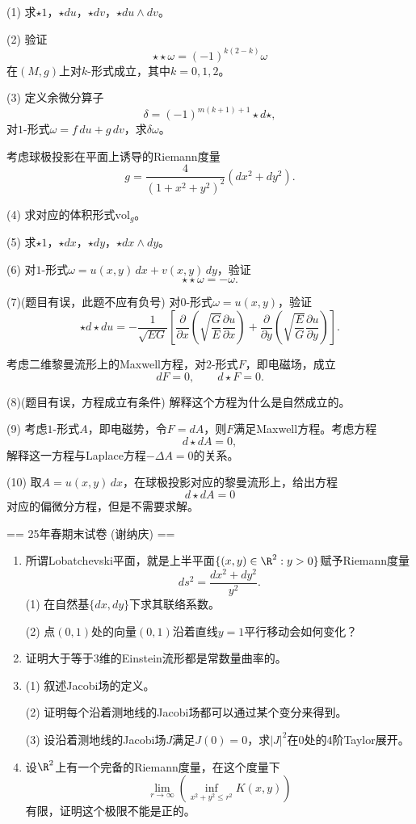 \begin{enumerate}
    (1) 求$\star 1$，$\star du$，$\star dv$，$\star du\wedge dv$。

    (2) 验证
    $$\star\star\omega=(-1)^{k(2-k)}\omega$$
    在$(M,g)$上对$k$-形式成立，其中$k=0,1,2$。

    (3) 定义余微分算子
    $$\delta=(-1)^{m(k+1)+1}\star d\star,$$
    对$1$-形式$\omega=f\,du+g\,dv$，求$\delta\omega$。

    考虑球极投影在平面上诱导的Riemann度量
    $$g=\frac{4}{(1+x^2+y^2)^2}(dx^2+dy^2).$$

    (4) 求对应的体积形式$\mathrm{vol}_g$。

    (5) 求$\star 1$，$\star dx$，$\star dy$，$\star dx\wedge dy$。

    (6) 对$1$-形式$\omega=u(x,y)\,dx+v(x,y)\,dy$，验证
    $$\star\star\omega=-\omega.$$

    (7)(题目有误，此题不应有负号) 对$0$-形式$\omega=u(x,y)$，验证
    $$\star d\star du=-\frac{1}{\sqrt{EG}}\left[\frac{\partial}{\partial x}\left(\sqrt{\frac{G}{E}}\frac{\partial u}{\partial x}\right)+\frac{\partial}{\partial y}\left(\sqrt{\frac{E}{G}}\frac{\partial u}{\partial y}\right)\right].$$

    考虑二维黎曼流形上的Maxwell方程，对$2$-形式$F$，即电磁场，成立
    $$dF=0,\qquad d\star F=0.$$

    (8)(题目有误，方程成立有条件) 解释这个方程为什么是自然成立的。

    (9) 考虑$1$-形式$A$，即电磁势，令$F=dA$，则$F$满足Maxwell方程。考虑方程
    $$d\star dA=0,$$
    解释这一方程与Laplace方程$-\Delta A=0$的关系。

    (10) 取$A=u(x,y)\,dx$，在球极投影对应的黎曼流形上，给出方程
    $$d\star dA=0$$
    对应的偏微分方程，但是不需要求解。
\end{enumerate}




== 25年春期末试卷 (谢纳庆) ==

\begin{enumerate}
    \item 所谓Lobatchevski平面，就是上半平面$\{(x,y)\in\R^2:y>0\}$赋予Riemann度量
    \[ds^2=\frac{dx^2+dy^2}{y^2}.\]
    (1) 在自然基$\{dx,dy\}$下求其联络系数。

    (2) 点$(0,1)$处的向量$(0,1)$沿着直线$y=1$平行移动会如何变化？

    \item 证明大于等于$3$维的Einstein流形都是常数量曲率的。

    \item (1) 叙述Jacobi场的定义。

    (2) 证明每个沿着测地线的Jacobi场都可以通过某个变分来得到。

    (3) 设沿着测地线的Jacobi场$J$满足$J(0)=0$，求$|J|^2$在$0$处的$4$阶Taylor展开。

    \item 设$\R^2$上有一个完备的Riemann度量，在这个度量下
    \[\lim_{r\to\infty}\left(\inf_{x^2+y^2 \le r^2}K(x,y)\right)\]
    有限，证明这个极限不能是正的。
\end{enumerate}